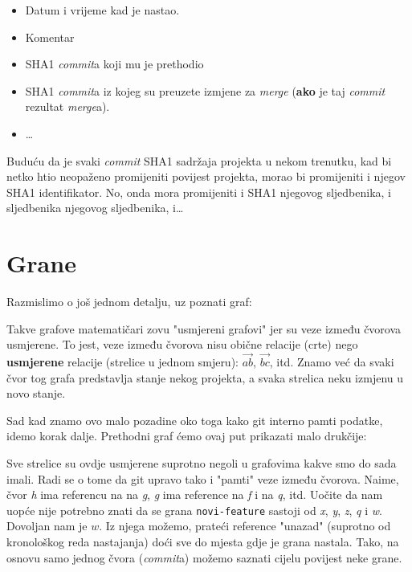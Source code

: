 \begin{itemize}
	\item Datum i vrijeme kad je nastao.
	\item Komentar
	\item SHA1 \emph{commit}a koji mu je prethodio
	\item SHA1 \emph{commit}a iz kojeg su preuzete izmjene za \emph{merge} (\textbf{ako} je taj \emph{commit} rezultat \emph{merge}a).
	\item \dots
\end{itemize}

Buduću da je svaki \emph{commit} SHA1 sadržaja projekta u nekom trenutku, kad bi netko htio neopaženo promijeniti povijest projekta, morao bi promijeniti i njegov SHA1 identifikator.
No, onda mora promijeniti i SHA1 njegovog sljedbenika, i sljedbenika njegovog sljedbenika, i\dots

\section*{Grane}

Razmislimo o još jednom detalju, uz poznati graf:



Takve grafove matematičari zovu "usmjereni grafovi" jer su veze između čvorova usmjerene.
To jest, veze između čvorova nisu obične relacije (crte) nego \textbf{usmjerene} relacije (strelice u jednom smjeru): $\vec{ab}$, $\vec{bc}$, itd.
Znamo već da svaki čvor tog grafa predstavlja stanje nekog projekta, a svaka strelica neku izmjenu u novo stanje.

Sad kad znamo ovo malo pozadine oko toga kako git interno pamti podatke, idemo korak dalje.
Prethodni graf ćemo ovaj put prikazati malo drukčije:



Sve strelice su ovdje usmjerene suprotno negoli u grafovima kakve smo do sada imali.
Radi se o tome da git upravo tako i "pamti" veze između čvorova.
Naime, čvor \emph h ima referencu na na \emph g, \emph g ima reference na \emph f i na \emph q, itd.
Uočite da nam uopće nije potrebno znati da se grana \verb+novi-feature+ sastoji od \emph x, \emph y, \emph z, \emph q i \emph w.
Dovoljan nam je $w$.
Iz njega možemo, prateći reference "unazad" (suprotno od kronološkog reda nastajanja) doći sve do mjesta gdje je grana nastala.
Tako, na osnovu samo jednog čvora (\emph{commit}a) možemo saznati cijelu povijest neke grane.

